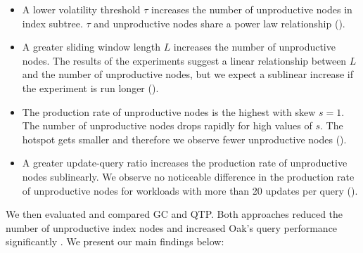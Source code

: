 \documentclass[abstracton,12pt]{scrartcl}
\theoremstyle{definition}
\begin{document}
\begin{itemize}

    \item A lower volatility threshold $\tau$ increases the number of 
        unproductive nodes in index subtree. $\tau$ and unproductive 
        nodes share a power law relationship ().

    \item A greater sliding window length $L$ increases the number of
        unproductive nodes. The results of the experiments suggest a
         linear relationship between $L$ and the number of unproductive
        nodes, but we expect a sublinear increase if the experiment is
        run longer ().

    \item The production rate of unproductive nodes is the highest with skew
        $s = 1$. The number of unproductive nodes drops rapidly for high
        values of $s$. The hotspot gets smaller and therefore we observe 
        fewer unproductive nodes ().

    \item A greater update-query ratio increases the production rate of
        unproductive nodes sublinearly.
        We observe no noticeable difference in the production rate of
        unproductive nodes for workloads with more than 20 updates per query
        ().

\end{itemize}

We then evaluated and compared GC and QTP. Both approaches reduced the
number of unproductive index nodes and increased Oak's query
performance significantly . We present our main findings below:
\end{document}
